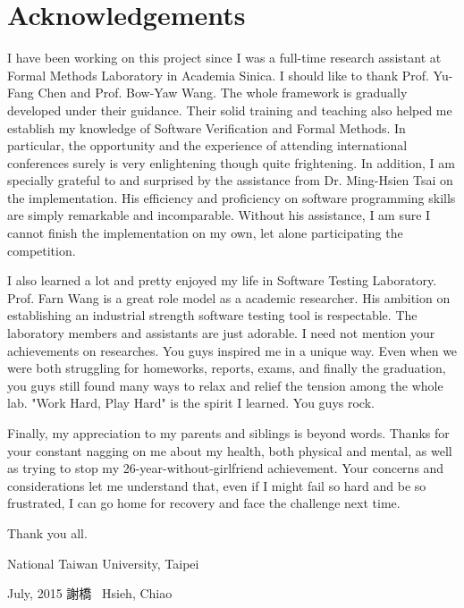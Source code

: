 
\chapter{Acknowledgements}

I have been working on this project since I was a full-time research assistant
at Formal Methods Laboratory in Academia Sinica.
I should like to thank Prof. Yu-Fang Chen and Prof. Bow-Yaw Wang.
The whole framework is gradually developed under their guidance.
Their solid training and teaching also helped me establish my knowledge of
Software Verification and Formal Methods.
In particular, the opportunity and the experience of attending international
conferences surely is very enlightening though quite frightening.
In addition, I am specially grateful to and surprised by the assistance from
Dr. Ming-Hsien Tsai on the implementation.
His efficiency and proficiency on software programming skills are simply
remarkable and incomparable.
Without his assistance, I am sure I cannot finish the implementation on my own,
let alone participating the competition.

I also learned a lot and pretty enjoyed my life in Software Testing Laboratory.
Prof. Farn Wang is a great role model as a academic researcher.
His ambition on establishing an industrial strength software testing tool is
respectable.
The laboratory members and assistants are just adorable.
I need not mention your achievements on researches.
You guys inspired me in a unique way.
Even when we were both struggling for homeworks, reports, exams, and finally
the graduation, you guys still found many ways to relax and relief the tension
among the whole lab.
"Work Hard, Play Hard" is the spirit I learned.
You guys rock.

Finally, my appreciation to my parents and siblings is beyond words.
Thanks for your constant nagging on me about my health, both physical and
mental, as well as trying to stop my 26-year-without-girlfriend achievement.
Your concerns and considerations let me understand that,
even if I might fail so hard and be so frustrated,
I can go home for recovery and face the challenge next time.

\vspace{8mm}

\noindent
Thank you all.

\vspace{8mm}

\noindent
National Taiwan University, Taipei

\noindent
July, 2015 \hfill 謝橋 \ Hsieh, Chiao

